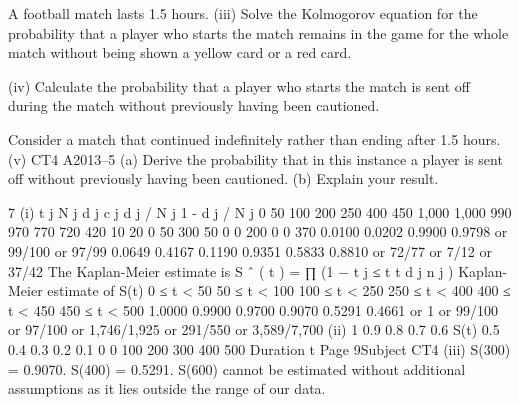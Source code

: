 A football match lasts 1.5 hours.
(iii) Solve the Kolmogorov equation for the probability that a player who starts the
match remains in the game for the whole match without being shown a yellow
card or a red card.

(iv) Calculate the probability that a player who starts the match is sent off during
the match without previously having been cautioned.

Consider a match that continued indefinitely rather than ending after 1.5 hours.
(v)
CT4 A2013–5
(a) Derive the probability that in this instance a player is sent off without
previously having been cautioned.
(b) Explain your result.

7
(i)
t j N j d j c j d j / N j 1 - d j / N j 0
50
100
200
250
400
450 1,000
1,000
990
970
770
720
420 10
20
0
50
300
50 0
0
200
0
0
370 0.0100
0.0202 0.9900
0.9798 or 99/100
or 97/99
0.0649
0.4167
0.1190 0.9351
0.5833
0.8810 or 72/77
or 7/12
or 37/42
The Kaplan-Meier estimate is S ˆ ( t ) = ∏ (1 −
t j ≤ t
t
d j
n j
)
Kaplan-Meier estimate of S(t)
0 ≤ t < 50
50 ≤ t < 100
100 ≤ t < 250
250 ≤ t < 400
400 ≤ t < 450
450 ≤ t < 500
1.0000
0.9900
0.9700
0.9070
0.5291
0.4661
or 1
or 99/100
or 97/100
or 1,746/1,925
or 291/550
or 3,589/7,700
(ii)
1
0.9
0.8
0.7
0.6
S(t) 0.5
0.4
0.3
0.2
0.1
0
0
100
200
300
400
500
Duration t
Page 9Subject CT4 %
(iii)
S(300) = 0.9070.
S(400) = 0.5291.
S(600) cannot be estimated without additional assumptions
as it lies outside the range of our data.

